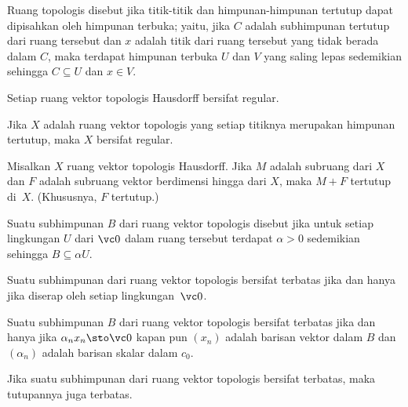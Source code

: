 \begin{defn} Ruang topologis disebut
 jika titik-titik dan himpunan-himpunan tertutup dapat dipisahkan oleh himpunan terbuka; yaitu, jika $C$ adalah subhimpunan tertutup dari ruang tersebut dan $x$ adalah titik
dari ruang tersebut yang tidak berada dalam $C$, maka terdapat himpunan terbuka $U$ dan $V$ yang saling lepas sedemikian sehingga $C \subseteq U$ dan $x \in V$.
\end{defn}

\begin{prop} Setiap ruang vektor topologis Hausdorff bersifat regular.
\end{prop}

\begin{cor} Jika $X$ adalah ruang vektor topologis yang setiap titiknya merupakan himpunan tertutup, maka $X$ bersifat regular.
\end{cor}

\begin{prop} Misalkan $X$ ruang vektor topologis Hausdorff.  Jika $M$ adalah subruang dari $X$ dan $F$ adalah subruang vektor berdimensi hingga
dari $X$, maka $M + F$ tertutup di~$X$. (Khususnya, $F$ tertutup.)
\end{prop}

\begin{defn} Suatu subhimpunan $B$ dari ruang vektor topologis disebut
 jika untuk setiap lingkungan $U$ dari $\vc 0$ dalam ruang tersebut terdapat $\alpha > 0$ sedemikian sehingga $B \subseteq \alpha U$.
\end{defn}

\begin{prop} Suatu subhimpunan dari ruang vektor topologis bersifat terbatas jika dan hanya jika diserap oleh setiap lingkungan~$\vc 0$.
\end{prop}

\begin{prop} Suatu subhimpunan $B$ dari ruang vektor topologis bersifat terbatas jika dan hanya jika $\alpha_n x_n \sto \vc 0$ kapan pun $(x_n)$ adalah
barisan vektor dalam $B$ dan $(\alpha_n)$ adalah barisan skalar dalam $c_0$.
\end{prop}

\begin{prop} Jika suatu subhimpunan dari ruang vektor topologis bersifat terbatas, maka tutupannya juga terbatas.
\end{prop}

